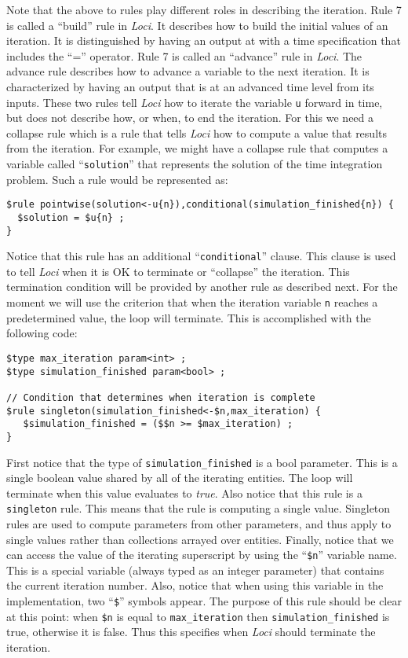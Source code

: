 \documentclass[10pt,epsf]{book}
\begin{document}
Note that the above to rules play different roles in describing the
iteration.  Rule 7 is called a ``build'' rule in {\it Loci}.  It describes
how to build the initial values of an iteration.  It is distinguished
by having an output at with a time specification that includes the
``='' operator.  Rule 7 is called an ``advance'' rule in {\it Loci}.  The
advance rule describes how to advance a variable to the next
iteration.  It is characterized by having an output that is at an
advanced time level from its inputs.  These two rules tell {\it Loci} how to
iterate the variable {\tt u} forward in time, but does not describe
how, or when, to end the iteration.  For this we need a collapse rule
which is a rule that tells {\it Loci} how to compute a value that results
from the iteration.  For example, we might have a collapse rule that
computes a variable called ``{\tt solution}'' that represents the
solution of the time integration problem.  Such a rule would be
represented as:
\begin{verbatim}
$rule pointwise(solution<-u{n}),conditional(simulation_finished{n}) {
  $solution = $u{n} ;
}
\end{verbatim}
Notice that this rule has an additional ``{\tt conditional}'' clause.
This clause is used to tell {\it Loci} when it is OK to terminate or
``collapse'' the iteration.  This termination condition will be
provided by another rule as described next.  For the moment we will
use the criterion that when the iteration variable {\tt n} reaches a
predetermined value, the loop will terminate.  This is accomplished
with the following code:

\begin{verbatim}
$type max_iteration param<int> ;
$type simulation_finished param<bool> ;

// Condition that determines when iteration is complete
$rule singleton(simulation_finished<-$n,max_iteration) {
   $simulation_finished = ($$n >= $max_iteration) ;
}
\end{verbatim}

First notice that the type of {\tt simulation\_finished} is a bool
parameter.  This is a single boolean value shared by all of the
iterating entities.  The loop will terminate when this value evaluates
to {\it true}.  Also notice that this rule is a {\tt singleton} rule.
This means that the rule is computing a single value.  Singleton rules
are used to compute parameters from other parameters, and thus apply
to single values rather than collections arrayed over entities.
Finally, notice that we can access the value of the iterating
superscript by using the ``{\tt \$n}'' variable name.  This is a
special variable (always typed as an integer parameter) that contains
the current iteration number.  Also, notice that when using this
variable in the implementation, two ``{\tt \$}'' symbols appear.  The
purpose of this rule should be clear at this point: when {\tt \$n} is
equal to {\tt max\_iteration} then {\tt simulation\_finished} is
true, otherwise it is false.  Thus this specifies when {\it Loci} should
terminate the iteration.
\end{document}
